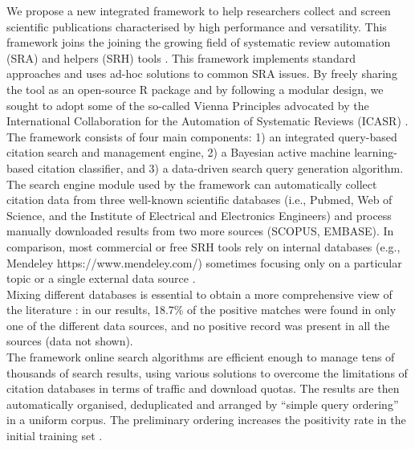 \documentclass[]{bmcart}
\begin{document}
We propose a new integrated framework to help researchers collect and
screen scientific publications characterised by high performance and
versatility. This framework joins the joining the growing field of
systematic review automation (SRA) and helpers (SRH) tools
\citep{cohen2006reducing, cohen2010evidence, ananiadou2009supporting, o2015using}.
This framework implements standard approaches and uses ad-hoc solutions
to common SRA issues. By freely sharing the tool as an open-source R
package and by following a modular design, we sought to adopt some of
the so-called Vienna Principles advocated by the International
Collaboration for the Automation of Systematic Reviews (ICASR)
\citep{beller2018making}.\\
The framework consists of four main components: 1) an integrated
query-based citation search and management engine, 2) a Bayesian active
machine learning-based citation classifier, and 3) a data-driven search
query generation algorithm.\\

The search engine module used by the framework can automatically collect
citation data from three well-known scientific databases (i.e., Pubmed,
Web of Science, and the Institute of Electrical and Electronics
Engineers) and process manually downloaded results from two more sources
(SCOPUS, EMBASE). In comparison, most commercial or free SRH tools rely
on internal databases (e.g., Mendeley https://www.mendeley.com/)
sometimes focusing only on a particular topic
\citep{visser2010performing} or a single external data source
\citep{thomas2007eppi, poulter2008mscanner, soto2019thalia}.\\
Mixing different databases is essential to obtain a more comprehensive
view of the literature
\citep{bajpai2011search, wilkins2005embase, woods1998medline}: in our
results, 18.7\% of the positive matches were found in only one of the
different data sources, and no positive record was present in all the
sources (data not shown).\\
The framework online search algorithms are efficient enough to manage
tens of thousands of search results, using various solutions to overcome
the limitations of citation databases in terms of traffic and download
quotas. The results are then automatically organised, deduplicated and
arranged by ``simple query ordering'' in a uniform corpus. The
preliminary ordering increases the positivity rate in the initial
training set \citep{wallace2010active}.\\
\end{document}
